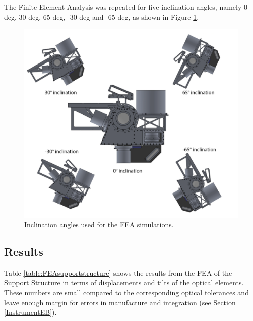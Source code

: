 \documentclass{report}
\begin{document}
The Finite Element Analysis was repeated for five inclination angles, namely 0 deg, 30 deg, 65 deg, -30 deg and -65 deg, as shown in Figure \ref{figure:FEAangles}.

\begin{figure}
\centering
\includegraphics[width=0.9\linewidth]{figures/FEAangles.png}
\caption{Inclination angles used for the FEA simulations.}
\label{figure:FEAangles}
\end{figure}

\subsection{Results}

Table \ref{table:FEAsupportstructure} shows the results from the FEA of the Support Structure in terms of displacements and tilts of the optical elements. These numbers are small compared to the corresponding optical tolerances and leave enough margin for errors in manufacture and integration (see Section~ \ref{InstrumentEB}).
\end{document}
